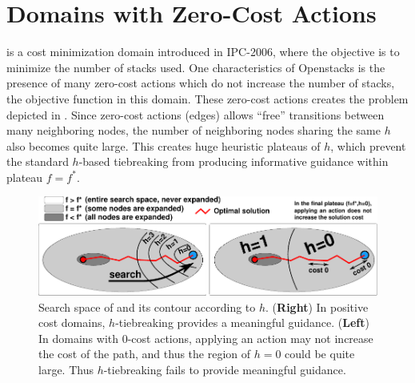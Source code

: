 \section{Domains with Zero-Cost Actions}
\label{sec:zerocost-domains}
  is a cost
minimization domain introduced in IPC-2006, where the objective is to 
minimize the number of stacks used.
One characteristics of Openstacks is the presence of many zero-cost actions which do not increase the number of stacks, the objective function in this domain. These zero-cost actions creates the problem depicted in .
Since zero-cost actions (edges) allows ``free'' transitions between many neighboring nodes,
the number of neighboring nodes sharing the same $h$ also becomes quite large.
This creates huge heuristic plateaus of $h$, which prevent the standard $h$-based tiebreaking from producing informative guidance within plateau $f=f^*$.

\begin{figure}[htbp]
  \centering
  \includegraphics{img/astar/plateau-1.pdf}
 \caption{Search space of \astar and its contour according to $h$. (\textbf{Right}) In positive cost domains, $h$-tiebreaking provides a meaningful guidance. (\textbf{Left}) In domains with 0-cost actions, applying an action may not increase the cost of the path, and thus the region of $h=0$ could be quite large. Thus $h$-tiebreaking fails to provide meaningful guidance.
  }
 \label{fig:plateau-1}
\end{figure}



